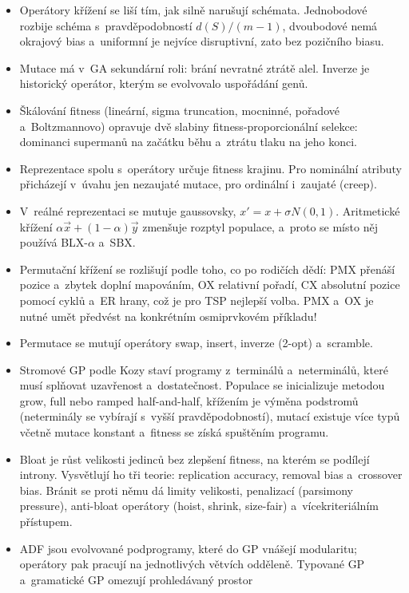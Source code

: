 \documentclass[11pt,a4paper]{article}
\theoremstyle{definition}
\begin{document}
\begin{itemize}
  hodnoty se přitom mohou lišit v~mnoha bitech naráz a~tyto Hammingovy útesy odstraňuje
  Grayův kód.
\item Operátory křížení se liší tím, jak silně narušují schémata. Jednobodové rozbije schéma
  s~pravděpodobností $d(S)/(m-1)$, dvoubodové nemá okrajový bias a~uniformní je nejvíce
  disruptivní, zato bez pozičního biasu.
\item Mutace má v~GA sekundární roli: brání nevratné ztrátě alel. Inverze je historický
  operátor, kterým se evolvovalo uspořádání genů.
\item Škálování fitness (lineární, sigma truncation, mocninné, pořadové a~Boltzmannovo)
  opravuje dvě slabiny fitness-proporcionální selekce: dominanci supermanů na začátku běhu
  a~ztrátu tlaku na jeho konci.
\item Reprezentace spolu s~operátory určuje fitness krajinu. Pro nominální atributy přicházejí
  v~úvahu jen nezaujaté mutace, pro ordinální i~zaujaté (creep).
\item V~reálné reprezentaci se mutuje gaussovsky, $x' = x + \sigma N(0,1)$. Aritmetické
  křížení $\alpha \vec x + (1-\alpha)\vec y$ zmenšuje rozptyl populace, a~proto se místo něj
  používá BLX-$\alpha$ a~SBX.
\item Permutační křížení se rozlišují podle toho, co po rodičích dědí: PMX přenáší pozice
  a~zbytek doplní mapováním, OX relativní pořadí, CX absolutní pozice pomocí cyklů a~ER hrany,
  což je pro TSP nejlepší volba. PMX a~OX je nutné umět předvést na konkrétním osmiprvkovém
  příkladu!
\item Permutace se mutují operátory swap, insert, inverze (2-opt) a~scramble.
\item Stromové GP podle Kozy staví programy z~terminálů a~neterminálů, které musí splňovat
  uzavřenost a~dostatečnost. Populace se inicializuje metodou grow, full nebo ramped
  half-and-half, křížením je výměna podstromů (neterminály se vybírají s~vyšší
  pravděpodobností), mutací existuje více typů včetně mutace konstant a~fitness se získá
  spuštěním programu.
\item Bloat je růst velikosti jedinců bez zlepšení fitness, na kterém se podílejí introny.
  Vysvětlují ho tři teorie: replication accuracy, removal bias a~crossover bias. Bránit se
  proti němu dá limity velikosti, penalizací (parsimony pressure), anti-bloat operátory
  (hoist, shrink, size-fair) a~vícekriteriálním přístupem.
\item ADF jsou evolvované podprogramy, které do GP vnášejí modularitu; operátory pak pracují
  na jednotlivých větvích odděleně. Typované GP a~gramatické GP omezují prohledávaný prostor

\end{itemize}
\end{document}
